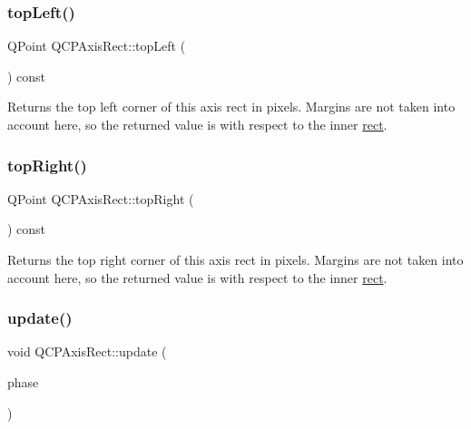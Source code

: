 \subsubsection{\texorpdfstring{top\+Left()}{topLeft()}}
{\footnotesize\ttfamily Q\+Point Q\+C\+P\+Axis\+Rect\+::top\+Left (\begin{DoxyParamCaption}{ }\end{DoxyParamCaption}) const\hspace{0.3cm}{\ttfamily [inline]}}

Returns the top left corner of this axis rect in pixels. Margins are not taken into account here, so the returned value is with respect to the inner \mbox{\hyperlink{class_q_c_p_layout_element_a208effccfe2cca4a0eaf9393e60f2dd4}{rect}}. \mbox{\label{class_q_c_p_axis_rect_a7aa221967549ba71b98c465bf8234758}} 
\subsubsection{\texorpdfstring{top\+Right()}{topRight()}}
{\footnotesize\ttfamily Q\+Point Q\+C\+P\+Axis\+Rect\+::top\+Right (\begin{DoxyParamCaption}{ }\end{DoxyParamCaption}) const\hspace{0.3cm}{\ttfamily [inline]}}

Returns the top right corner of this axis rect in pixels. Margins are not taken into account here, so the returned value is with respect to the inner \mbox{\hyperlink{class_q_c_p_layout_element_a208effccfe2cca4a0eaf9393e60f2dd4}{rect}}. \mbox{\label{class_q_c_p_axis_rect_a255080a017df9083a60a321ef2ba9ed8}} 
\subsubsection{\texorpdfstring{update()}{update()}}
{\footnotesize\ttfamily void Q\+C\+P\+Axis\+Rect\+::update (\begin{DoxyParamCaption}\item[{\mbox{\hyperlink{class_q_c_p_layout_element_a0d83360e05735735aaf6d7983c56374d}{Update\+Phase}}}]{phase }\end{DoxyParamCaption})\hspace{0.3cm}{\ttfamily [virtual]}}

